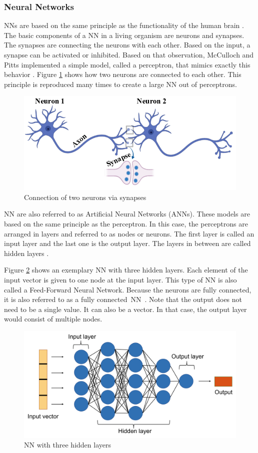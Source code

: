 \subsubsection*{Neural Networks}\label{NN chapter}
NNs are based on the same principle as the functionality of the human brain \cite{Janiesch}.
The basic components of a NN in a living organism are neurons and synapses. The synapses are connecting the neurons with each other. Based on the input, a synapse can be activated or inhibited. Based on that observation, McCulloch and Pitts implemented a simple model, called a perceptron, that mimics exactly this behavior \cite{Theodoridis}.
Figure \ref{fig:2nn} shows how two neurons are connected to each other. This principle is reproduced many times to create a large NN out of perceptrons.
\begin{figure}[H]
	\centering
	\includegraphics[width=0.8\linewidth]{IMGs/2NN.png}
	\caption{Connection of two neurons via synapses \cite{Das}}
	\label{fig:2nn}
\end{figure}

\newpage
NN are also referred to as Artificial Neural Networks (ANNs). These models are based on the same principle as the perceptron. In this case, the perceptrons are arranged in layers and referred to as nodes or neurons. The first layer is called an input layer and the last one is the output layer. The layers in between are called hidden layers \cite{JOOST}. 

Figure \ref{fig:NN1} shows an exemplary NN with three hidden layers. Each element of the input vector is given to one node at the input layer. This type of NN is also called a Feed-Forward Neural Network. Because the neurons are fully connected, it is also referred to as a fully connected~NN~\cite{Sainath}. Note that the output does not need to be a single value. It can also be a vector. In that case, the output layer would consist of multiple nodes.

\begin{figure}[H]
	\centering
	\includegraphics[width=0.8\linewidth]{IMGs/NN1.png}
	\caption{NN with three hidden layers}
	\label{fig:NN1}
\end{figure}
 
